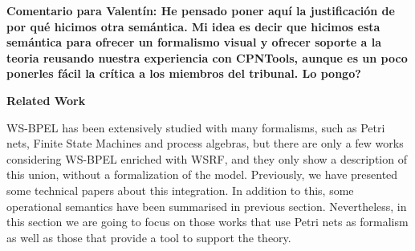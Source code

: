 {\bf Comentario para Valent\'in: He pensado poner aqu\'i la justificaci\'on de por qu\'e hicimos otra sem\'antica. Mi idea es decir que hicimos esta sem\'antica para ofrecer un formalismo visual y ofrecer soporte a la teoria reusando nuestra experiencia con CPNTools, aunque es un poco ponerles f\'acil la cr\'itica a los miembros del tribunal. Lo pongo?} 

{\bf Related Work}

WS-BPEL has been extensively studied with many formalisms, such as
Petri nets, Finite State Machines and process algebras, but 
there are only a few works considering WS-BPEL enriched with 
WSRF, and they only show a description of this union, 
without a formalization of the model. Previously, we have presented some technical papers about this integration.
In addition to this, some operational semantics have been summarised in previous section. Nevertheless, 
in this section we are going to focus on those works that use Petri nets as formalism as well as those that provide
a tool to support the theory.

